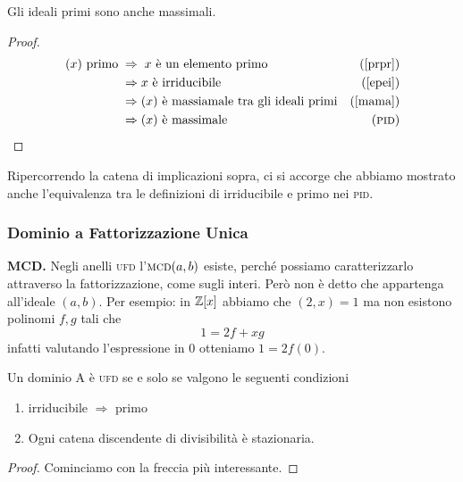 \begin{multicols}{2}
\begin{theorem}\label{primossemassimale}
	Gli ideali primi sono anche massimali.
\end{theorem}
\begin{proof}
	\begin{align*}
		(x) \text{ primo} \;& \Rightarrow\; x \text{ è un elemento primo} & \text{(\ref{prpr})} \\
		& \Rightarrow x \text{ è irriducibile} &\text{(\ref{epei})} \\
		& \Rightarrow (x) \text{ è massiamale tra gli ideali primi} &\text{(\ref{mama})} \\
		& \Rightarrow (x) \text{ è massimale} &\text{(\textsc{pid})}
	\end{align*}
\end{proof}

\begin{remark}
	Ripercorrendo la catena di implicazioni sopra, ci si accorge che abbiamo mostrato anche l'equivalenza tra le definizioni di irriducibile e primo  nei \textsc{pid}.
\end{remark}

\subsubsection{Dominio a Fattorizzazione Unica}

\textbf{MCD.} Negli anelli \textsc{ufd} l'$ \textsc{mcd}(a, b) $ esiste, perché possiamo caratterizzarlo attraverso la fattorizzazione, come sugli interi. Però non è detto che appartenga all'ideale $ (a, b) $. Per esempio: in $ \mathbb{Z}[x] $ abbiamo che $ (2, x) = 1 $ ma non esistono polinomi $ f, g $ tali che
\[ 1 = 2f + xg \]
infatti valutando l'espressione in $ 0 $ otteniamo $ 1 = 2f(0) $.

\begin{theorem} \label{carufd}
	Un dominio A è \textsc{ufd} se e solo se valgono le seguenti condizioni
	\begin{enumerate}
		\item irriducibile $ \Rightarrow $ primo
		\item Ogni catena discendente di divisibilità è stazionaria.
	\end{enumerate}
\end{theorem}

\begin{proof}
	Cominciamo con la freccia più interessante.
	

\end{proof}
\end{multicols}
